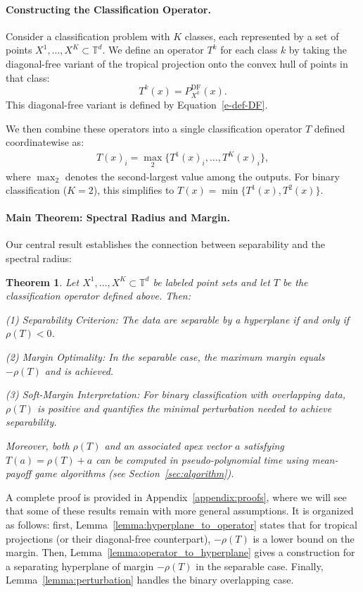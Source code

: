 \documentclass{article}
\newtheorem{theorem}{Theorem}
\newcommand{\trop}{\mathbb{T}}
\begin{document}
\paragraph{Constructing the Classification Operator.}
Consider a classification problem with $K$ classes, each represented by a set of points $X^1,\dots,X^K \subset \trop^d$. We define an operator $T^k$ for each class $k$ by taking the diagonal-free variant of the tropical projection onto the convex hull of points in that class:
\[
T^k(x) = P_{X^k}^{\text{DF}}(x).
\]
This diagonal-free variant is defined by Equation~\ref{e-def-DF}.

We then combine these operators into a single classification operator $T$ defined coordinatewise as:
\begin{align}
  T(x)_i = \operatorname{\max}_2\{T^1(x)_i, \dots, T^K(x)_i\}\label{eq:single_operator},
\end{align}
where $\operatorname{\max}_2$ denotes the second-largest value among the outputs. For binary classification ($K=2$), this simplifies to $T(x)=\min\{T^1(x), T^2(x)\}$.

\paragraph{Main Theorem: Spectral Radius and Margin.}
Our central result establishes the connection between separability and the spectral radius:
\begin{theorem}\label{thm:spectral_separability}
Let $X^1,\ldots,X^K \subset \trop^d$ be labeled point sets and let $T$ be the classification operator defined above. Then:

(1) \textit{Separability Criterion:} The data are separable by a hyperplane if and only if $\rho(T) < 0$.

(2) \textit{Margin Optimality:} In the separable case, the maximum margin equals $-\rho(T)$ and is achieved.

(3) \textit{Soft-Margin Interpretation:} For binary classification with overlapping data, $\rho(T)$ is positive and quantifies the minimal perturbation needed to achieve separability.

Moreover, both $\rho(T)$ and an associated apex vector $a$ satisfying $T(a) = \rho(T)+a$ can be computed in pseudo-polynomial time using mean-payoff game algorithms (see Section~\ref{sec:algorithm}).
\end{theorem}
A complete proof is provided in Appendix~\ref{appendix:proofs}, where we will see that some of these results remain with more general assumptions.
It is organized as follows: first, Lemma~\ref{lemma:hyperplane_to_operator} states that for tropical projections (or their diagonal-free counterpart), $-\rho(T)$ is a lower bound on the margin.
Then, Lemma~\ref{lemma:operator_to_hyperplane} gives a construction for a separating hyperplane of margin $-\rho(T)$ in the separable case. Finally, Lemma~\ref{lemma:perturbation} handles the binary overlapping case.
\end{document}
